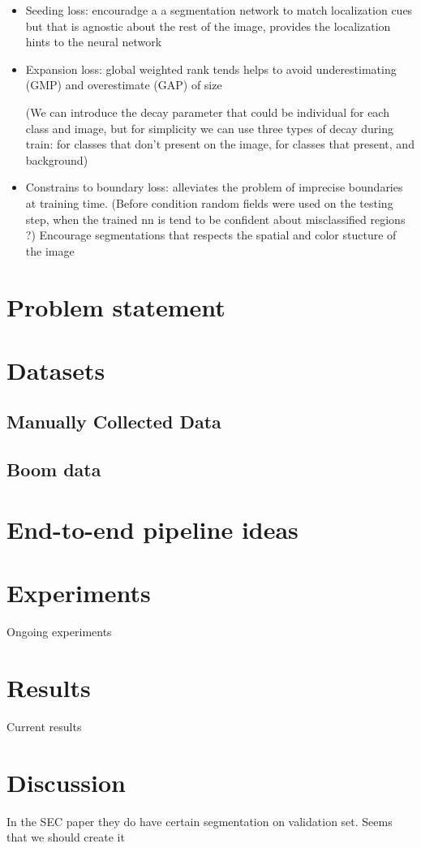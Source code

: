 \documentclass[12pt,a4paper,notitlepage]{amsart}
\begin{document}
\begin{itemize}
	\item Seeding loss: encouradge a a segmentation network to match localization cues but that is agnostic about the rest of the image, provides the localization hints to the neural network

	\item Expansion loss: global weighted rank tends helps to avoid underestimating (GMP) and overestimate (GAP) of size

     (We can introduce the decay parameter that could be individual for each class and image, but for simplicity we can use three types of decay during train: for classes that don't present on the image, for classes that present, and background)

	\item Constrains to boundary loss: alleviates the problem of  imprecise boundaries at training time. (Before condition random fields were used on the testing step, when the trained nn is tend to be confident about misclassified regions ?) Encourage segmentations that respects the spatial and color stucture of the image
\end{itemize}

      
   
   
   \section{Problem statement}
      
   \section{Datasets}
   
   \subsection{Manually Collected Data}
     
   \subsection{Boom data}
   
   \section{End-to-end pipeline ideas}
   
   
   \section{Experiments}
   Ongoing experiments
   
   \section{Results}
   Current results   
   
   \section{Discussion}   
   In the SEC paper they do have certain segmentation on validation set. Seems that we should create it   
   
\nocite{*}

  
   
\end{document}
